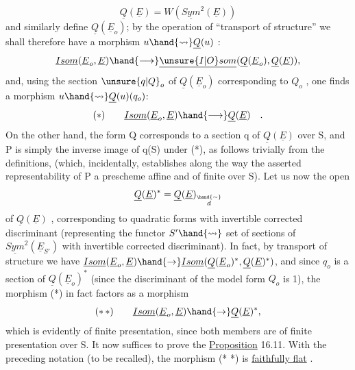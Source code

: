 
\[ \underline{Q}(\underline{E}) =W(\underline{Sym}^2(\underline{E})) \]
and similarly define $\underline{Q}(\underline{E}_o)$; by the operation of ``transport of
structure'' we shall therefore have a morphism $u \hand{\rightsquigarrow} \underline{Q}(u)$ :
\[ \underline{Isom}(\underline{E}_o,\underline{E}) \hand{\longrightarrow} \underline{\unsure{I|O}som}(\underline{Q}(\underline{E}_o),\underline{Q}(\underline{E})), \]
and, using the section $\unsure{q|Q}_o$ of $\underline{Q}(\underline{E}_o)$ corresponding to $Q_o$ , one finds a
morphism $u \hand{\rightsquigarrow} \underline{Q}(u)(q_o)$:
\[ (*) \qquad \underline{Isom}(\underline{E}_o,\underline{E}) \hand{\longrightarrow} \underline{Q}(\underline{E}) \quad . \]
On the other hand, the form Q  corresponds to a section q of $\underline{Q}(\underline{E})$ over S,
and P is simply the inverse image of q(S) under (*), as follows
trivially from the definitions, (which, incidentally, establishes along the way the
asserted representability of P  a prescheme affine and of finite 
over S). Let us now  the open 
\[ \underline{Q}(\underline{E})^* = \underline{Q}(\underline{E})_{\overset{\hand{\sim}}{d}} \]
of $\underline{Q}(\underline{E})$ , corresponding to quadratic forms with invertible corrected
discriminant (representing the functor $S' \hand{\rightsquigarrow}$ set of 
sections of $\underline{Sym}^2(\underline{E}_{S'})$ with invertible corrected discriminant). In fact,
by transport of structure we have $\underline{Isom}(\underline{E}_o,\underline{E}) \hand{\rightarrow} \underline{Isom}(\underline{Q}(\underline{E}_o)^*,\underline{Q}(\underline{E})^*)$, and
since $q_o$ is a section of $\underline{Q}(\underline{E}_o)^*$ (since the  discriminant of
the model form $Q_o$ is 1), the morphism (*) in fact factors as a
morphism
\[ (*\,*) \qquad \underline{Isom}(\underline{E}_o,\underline{E}) \hand{\rightarrow} \underline{Q}(\underline{E})^* , \]
which is evidently of finite presentation, since both members are of
finite presentation over S. It now suffices to prove the
 \uline{Proposition} 16.11. With the preceding notation (to be recalled),
the morphism (* *) is \uline{faithfully flat} .

